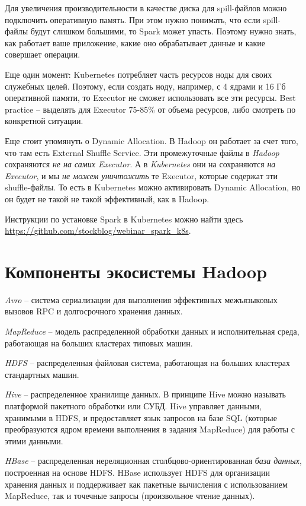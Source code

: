 \documentclass[%
	11pt,
	a4paper,
	utf8,
		]{article}
\begin{document}
Для увеличения производительности в качестве диска для spill-файлов можно подключить оперативную память. При этом нужно понимать, что если spill-файлы будут слишком большими, то Spark может упасть. Поэтому нужно знать, как работает ваше приложение, какие оно обрабатывает данные и какие совершает операции.

Еще один момент: Kubernetes потребляет часть ресурсов ноды для своих служебных целей. Поэтому, если создать ноду, например, с 4 ядрами и 16 Гб оперативной памяти, то Executor не сможет использовать все эти ресурсы. Best practice -- выделять для Executor 75-85\% от объема ресурсов, либо смотреть по конкретной ситуации.

Еще стоит упомянуть о Dynamic Allocation. В Hadoop он работает за счет того, что там есть External Shuffle Service. Эти промежуточные файлы в \emph{Hadoop} сохраняются \emph{не на самих Executor}. А в \emph{Kubernetes} они на сохраняются \emph{на Executor}, и мы \emph{\color{red} не можем уничтожить} те Executor, которые содержат эти shuffle-файлы. То есть в Kubernetes можно активировать Dynamic Allocation, но он будет не такой не такой эффективный, как в Hadoop.

Инструкции по установке Spark в Kubernetes можно найти здесь \url{https://github.com/stockblog/webinar_spark_k8s}.




\section{Компоненты экосистемы Hadoop}

\emph{Avro} -- система сериализации для выполнения эффективных межъязыковых вызовов RPC и долгосрочного хранения данных.

\emph{MapReduce} -- модель распределенной обработки данных и исполнительная среда, работающая на больших кластерах типовых машин.

\emph{HDFS} -- распределенная файловая система, работающая на больших кластерах стандартных машин.

\emph{Hive} -- распределенное хранилище данных. В принципе Hive можно называть платформой пакетного обработки или СУБД. Hive управляет данными, хранимыми в HDFS, и предоставляет язык запросов на базе SQL (которые преобразуются ядром времени выполнения в задания MapReduce) для работы с этими данными.

\emph{HBase} -- распределенная нереляционная столбцово-ориентированная \emph{база данных}, построенная на основе HDFS. HBase использует HDFS для организации хранения данных и поддерживает как пакетные вычисления с использованием MapReduce, так и точечные запросы (произвольное чтение данных).
\end{document}
